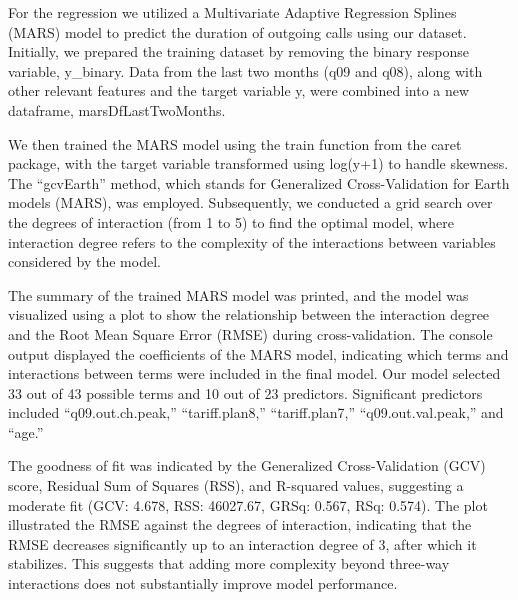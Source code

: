 \documentclass[
]{article}
\begin{document}
For the regression we utilized a Multivariate Adaptive Regression
Splines (MARS) model to predict the duration of outgoing calls using our
dataset. Initially, we prepared the training dataset by removing the
binary response variable, y\_binary. Data from the last two months (q09
and q08), along with other relevant features and the target variable y,
were combined into a new dataframe, marsDfLastTwoMonths.

We then trained the MARS model using the train function from the caret
package, with the target variable transformed using log(y+1) to handle
skewness. The ``gcvEarth'' method, which stands for Generalized
Cross-Validation for Earth models (MARS), was employed. Subsequently, we
conducted a grid search over the degrees of interaction (from 1 to 5) to
find the optimal model, where interaction degree refers to the
complexity of the interactions between variables considered by the
model.

The summary of the trained MARS model was printed, and the model was
visualized using a plot to show the relationship between the interaction
degree and the Root Mean Square Error (RMSE) during cross-validation.
The console output displayed the coefficients of the MARS model,
indicating which terms and interactions between terms were included in
the final model. Our model selected 33 out of 43 possible terms and 10
out of 23 predictors. Significant predictors included
``q09.out.ch.peak,'' ``tariff.plan8,'' ``tariff.plan7,''
``q09.out.val.peak,'' and ``age.''

The goodness of fit was indicated by the Generalized Cross-Validation
(GCV) score, Residual Sum of Squares (RSS), and R-squared values,
suggesting a moderate fit (GCV: 4.678, RSS: 46027.67, GRSq: 0.567, RSq:
0.574). The plot illustrated the RMSE against the degrees of
interaction, indicating that the RMSE decreases significantly up to an
interaction degree of 3, after which it stabilizes. This suggests that
adding more complexity beyond three-way interactions does not
substantially improve model performance.
\end{document}
